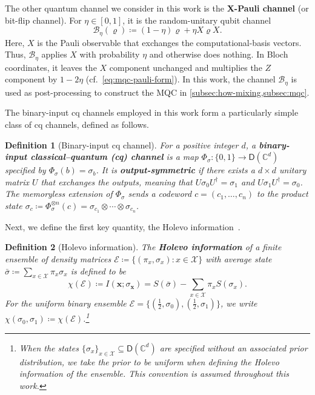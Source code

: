 \documentclass[11pt]{article}
\newtheorem{definition}{Definition}[section]
\theoremstyle{remark}
\newcommand{\cX}{\mathcal{X}}
\newcommand{\cE}{\mathcal{E}}
\newcommand{\C}{\mathbb{C}}
\newcommand{\Dens}{\mathsf{D}}
\newcommand{\bits}{\{0,1\}}
\newcommand{\bx}{\mathbf{x}}
\begin{document}
The other quantum channel we consider in this work is the \textbf{X-Pauli channel} (or bit-flip channel). For $\eta \in [0,1]$, it is the random-unitary qubit channel
\begin{equation}
\label{eq:pauli-x-channel}
\mathcal{B}_\eta(\varrho) \coloneqq (1-\eta)\varrho + \eta X\varrho X.
\end{equation}
Here, $X$ is the Pauli observable that exchanges the computational-basis vectors. Thus, $\mathcal{B}_\eta$ applies $X$ with probability $\eta$ and otherwise does nothing. In Bloch coordinates, it leaves the $X$ component unchanged and multiplies the $Z$ component by $1-2\eta$ (cf.~\eqref{eq:mqc-pauli-form}). In this work, the channel $\mathcal{B}_\eta$ is used as post-processing to construct the MQC in \cref{subsec:how-mixing,subsec:mqc}.

The binary-input cq channels employed in this work form a particularly simple class of cq channels, defined as follows.

\begin{definition}[Binary-input cq channel]
\label{def:binary-cq-channel}
For a positive integer $d$, a \textbf{binary-input classical--quantum (cq) channel} is a map $\Phi_\sigma : \bits \to \Dens(\C^d)$ specified by $\Phi_\sigma(b) = \sigma_b$. It is \textbf{output-symmetric} if there exists a $d \times d$ unitary matrix $U$ that exchanges the outputs, meaning that $U\sigma_0U^\dagger = \sigma_1$ and $U\sigma_1U^\dagger = \sigma_0$. The memoryless extension of $\Phi_\sigma$ sends a codeword $c = (c_1,\ldots,c_n)$ to the product state $\sigma_c \coloneqq \Phi_\sigma^{\otimes n}(c) = \sigma_{c_1} \otimes \cdots \otimes \sigma_{c_n}$.
\end{definition}

Next, we define the first key quantity, the Holevo information~\cite{Hol73a}.

\begin{definition}[Holevo information]
\label{def:holevo-information}
The \textbf{Holevo information} of a finite ensemble of density matrices $\cE \coloneqq \{(\pi_x,\sigma_x) : x \in \cX\}$ with average state $\bar{\sigma} \coloneqq \sum_{x \in \cX}{\pi_x\sigma_x}$ is defined to be 
\begin{equation}
\label{eq:holevo-formula}
\chi(\cE) \coloneqq I(\bx;\sigma_\bx) = S(\bar{\sigma})-\sum_{x \in \cX}{\pi_xS(\sigma_x)}.
\end{equation}
For the uniform binary ensemble $\cE = \{(\frac{1}{2},\sigma_0),(\frac{1}{2},\sigma_1)\}$, we write $\chi(\sigma_0,\sigma_1) \coloneqq \chi(\cE)$.\footnote{When the states $\{\sigma_x\}_{x \in \cX} \subseteq \Dens(\C^d)$ are specified without an associated prior distribution, we take the prior to be uniform when defining the Holevo information of the ensemble. This convention is assumed throughout this work.}
\end{definition}
\end{document}
